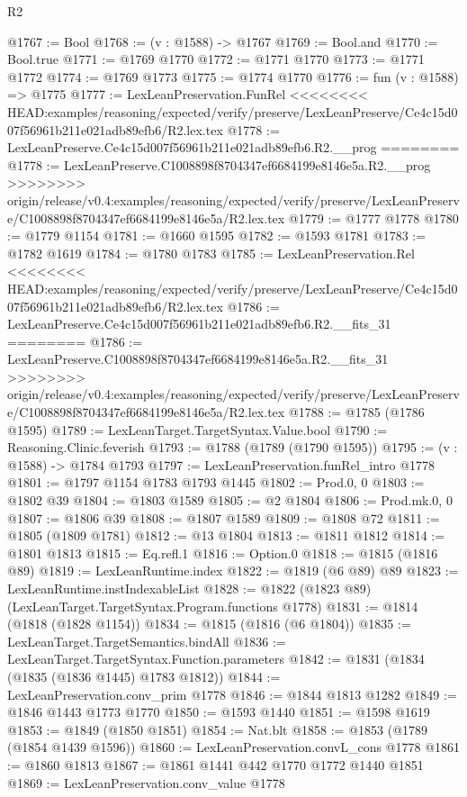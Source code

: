 \begin{lexlean}{R2}
\begin{coremodule}
{{{{{{{{{{{{{{{{{{{{{{{{{{{{{{{{{{{{{{{{{{{{{{{{{{{{{{{{{{{{{{{{{{{{{{{{{{{{{{{{{{{{{{{{{{{{@1767 := Bool
@1768 := (v : @1588) -> @1767
@1769 := Bool.and
@1770 := Bool.true
@1771 := @1769 @1770
@1772 := @1771 @1770
@1773 := @1771 @1772
@1774 := @1769 @1773
@1775 := @1774 @1770
@1776 := fun (v : @1588) => @1775
@1777 := LexLeanPreservation.FunRel
<<<<<<<< HEAD:examples/reasoning/expected/verify/preserve/LexLeanPreserve/Ce4c15d007f56961b211e021adb89efb6/R2.lex.tex
@1778 := LexLeanPreserve.Ce4c15d007f56961b211e021adb89efb6.R2.__prog
========
@1778 := LexLeanPreserve.C1008898f8704347ef6684199e8146e5a.R2.__prog
>>>>>>>> origin/release/v0.4:examples/reasoning/expected/verify/preserve/LexLeanPreserve/C1008898f8704347ef6684199e8146e5a/R2.lex.tex
@1779 := @1777 @1778
@1780 := @1779 @1154
@1781 := @1660 @1595
@1782 := @1593 @1781
@1783 := @1782 @1619
@1784 := @1780 @1783
@1785 := LexLeanPreservation.Rel
<<<<<<<< HEAD:examples/reasoning/expected/verify/preserve/LexLeanPreserve/Ce4c15d007f56961b211e021adb89efb6/R2.lex.tex
@1786 := LexLeanPreserve.Ce4c15d007f56961b211e021adb89efb6.R2.__fits_31
========
@1786 := LexLeanPreserve.C1008898f8704347ef6684199e8146e5a.R2.__fits_31
>>>>>>>> origin/release/v0.4:examples/reasoning/expected/verify/preserve/LexLeanPreserve/C1008898f8704347ef6684199e8146e5a/R2.lex.tex
@1788 := @1785 (@1786 @1595)
@1789 := LexLeanTarget.TargetSyntax.Value.bool
@1790 := Reasoning.Clinic.feverish
@1793 := @1788 (@1789 (@1790 @1595))
@1795 := (v : @1588) -> @1784 @1793
@1797 := LexLeanPreservation.funRel_intro @1778
@1801 := @1797 @1154 @1783 @1793 @1445
@1802 := Prod.{0, 0}
@1803 := @1802 @39
@1804 := @1803 @1589
@1805 := @2 @1804
@1806 := Prod.mk.{0, 0}
@1807 := @1806 @39
@1808 := @1807 @1589
@1809 := @1808 @72
@1811 := @1805 (@1809 @1781)
@1812 := @13 @1804
@1813 := @1811 @1812
@1814 := @1801 @1813
@1815 := Eq.refl.{1}
@1816 := Option.{0}
@1818 := @1815 (@1816 @89)
@1819 := LexLeanRuntime.index
@1822 := @1819 (@6 @89) @89
@1823 := LexLeanRuntime.instIndexableList
@1828 := @1822 (@1823 @89) (LexLeanTarget.TargetSyntax.Program.functions @1778)
@1831 := @1814 (@1818 (@1828 @1154))
@1834 := @1815 (@1816 (@6 @1804))
@1835 := LexLeanTarget.TargetSemantics.bindAll
@1836 := LexLeanTarget.TargetSyntax.Function.parameters
@1842 := @1831 (@1834 (@1835 (@1836 @1445) @1783 @1812))
@1844 := LexLeanPreservation.conv_prim @1778
@1846 := @1844 @1813 @1282
@1849 := @1846 @1443 @1773 @1770
@1850 := @1593 @1440
@1851 := @1598 @1619
@1853 := @1849 (@1850 @1851)
@1854 := Nat.blt
@1858 := @1853 (@1789 (@1854 @1439 @1596))
@1860 := LexLeanPreservation.convL_cons @1778
@1861 := @1860 @1813
@1867 := @1861 @1441 @442 @1770 @1772 @1440 @1851
@1869 := LexLeanPreservation.conv_value @1778
}}}}}}}}}}}}}}}}}}}}}}}}}}}}}}}}}}}}}}}}}}}}}}}}}}}}}}}}}}}}}}}}}}}}}}}}}}}}}}}}}}}}}}}}}}}}
\end{coremodule}
\end{lexlean}
